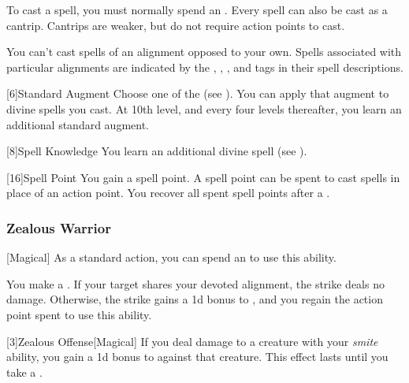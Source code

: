             To cast a spell, you must normally spend an .
            Every spell can also be cast as a cantrip.
            Cantrips are weaker, but do not require action points to cast.

            You can't cast spells of an alignment opposed to your own.
            Spells associated with particular alignments are indicated by the , , , and  tags in their spell descriptions.

            [6]{Standard Augment}
            Choose one of the  (see ).
            You can apply that augment to divine spells you cast.
            At 10th level, and every four levels thereafter, you learn an additional standard augment.

            [8]{Spell Knowledge}
            You learn an additional divine spell (see ).

            [16]{Spell Point} 
            You gain a spell point.
            A spell point can be spent to cast spells in place of an action point.
            You recover all spent spell points after a .

        \subsubsection{Zealous Warrior}
            [Magical] As a standard action, you can spend an  to use this ability.
            \begin{ability}
                \begin{spelleffects}
                    \spelleffect You make a .
                    If your target shares your devoted alignment, the strike deals no damage.
                    Otherwise, the strike gains a \plus1d bonus to , and you regain the action point spent to use this ability.
                \end{spelleffects}
            \end{ability}

            [3]{Zealous Offense}[Magical]
            If you deal damage to a creature with your \textit{smite} ability, you gain a \plus1d bonus to  against that creature.
            This effect lasts until you take a .

